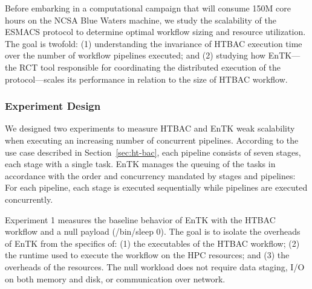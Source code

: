 
Before embarking in a computational campaign that will consume 150M core
hours on the NCSA Blue Waters machine, we study the scalability of the ESMACS
protocol to determine optimal workflow sizing and resource utilization. The
goal is twofold: (1) understanding the invariance of HTBAC execution time
over the number of workflow pipelines executed; and (2) studying how
EnTK---the RCT tool responsible for coordinating the distributed execution of
the protocol---scales its performance in relation to the size of HTBAC
workflow.

\subsubsection{Experiment Design}

We designed two experiments to measure HTBAC and EnTK weak scalability when
executing an increasing number of concurrent pipelines. According to the use
case described in Section~\ref{sec:ht-bac}, each pipeline consists of seven
stages, each stage with a single task. EnTK manages the queuing of the tasks
in accordance with the order and concurrency mandated by stages and
pipelines: For each pipeline, each stage is executed sequentially while
pipelines are executed concurrently.



Experiment 1 measures the baseline behavior of EnTK with the HTBAC workflow
and a null payload (\textmd{/bin/sleep 0}). The goal is to isolate the
overheads of EnTK from the specifics of: (1) the executables of the HTBAC
workflow; (2) the runtime used to execute the workflow on the HPC resources;
and (3) the overheads of the resources. The null workload does not require
data staging, I/O on both memory and disk, or communication over network.

